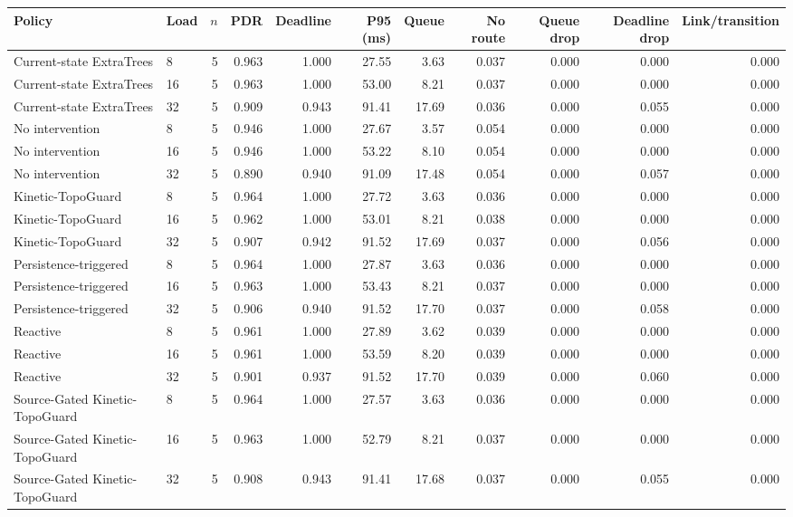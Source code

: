 \begin{tabular}{llrrrrrrrrr}
\toprule
Policy & Load & $n$ & PDR & Deadline & P95 (ms) & Queue & No route & Queue drop & Deadline drop & Link/transition \\
\midrule
Current\mbox{-}state ExtraTrees & 8 & 5 & 0.963 & 1.000 & 27.55 & 3.63 & 0.037 & 0.000 & 0.000 & 0.000 \\
Current\mbox{-}state ExtraTrees & 16 & 5 & 0.963 & 1.000 & 53.00 & 8.21 & 0.037 & 0.000 & 0.000 & 0.000 \\
Current\mbox{-}state ExtraTrees & 32 & 5 & 0.909 & 0.943 & 91.41 & 17.69 & 0.036 & 0.000 & 0.055 & 0.000 \\
No intervention & 8 & 5 & 0.946 & 1.000 & 27.67 & 3.57 & 0.054 & 0.000 & 0.000 & 0.000 \\
No intervention & 16 & 5 & 0.946 & 1.000 & 53.22 & 8.10 & 0.054 & 0.000 & 0.000 & 0.000 \\
No intervention & 32 & 5 & 0.890 & 0.940 & 91.09 & 17.48 & 0.054 & 0.000 & 0.057 & 0.000 \\
Kinetic\mbox{-}TopoGuard & 8 & 5 & 0.964 & 1.000 & 27.72 & 3.63 & 0.036 & 0.000 & 0.000 & 0.000 \\
Kinetic\mbox{-}TopoGuard & 16 & 5 & 0.962 & 1.000 & 53.01 & 8.21 & 0.038 & 0.000 & 0.000 & 0.000 \\
Kinetic\mbox{-}TopoGuard & 32 & 5 & 0.907 & 0.942 & 91.52 & 17.69 & 0.037 & 0.000 & 0.056 & 0.000 \\
Persistence\mbox{-}triggered & 8 & 5 & 0.964 & 1.000 & 27.87 & 3.63 & 0.036 & 0.000 & 0.000 & 0.000 \\
Persistence\mbox{-}triggered & 16 & 5 & 0.963 & 1.000 & 53.43 & 8.21 & 0.037 & 0.000 & 0.000 & 0.000 \\
Persistence\mbox{-}triggered & 32 & 5 & 0.906 & 0.940 & 91.52 & 17.70 & 0.037 & 0.000 & 0.058 & 0.000 \\
Reactive & 8 & 5 & 0.961 & 1.000 & 27.89 & 3.62 & 0.039 & 0.000 & 0.000 & 0.000 \\
Reactive & 16 & 5 & 0.961 & 1.000 & 53.59 & 8.20 & 0.039 & 0.000 & 0.000 & 0.000 \\
Reactive & 32 & 5 & 0.901 & 0.937 & 91.52 & 17.70 & 0.039 & 0.000 & 0.060 & 0.000 \\
Source\mbox{-}Gated Kinetic\mbox{-}TopoGuard & 8 & 5 & 0.964 & 1.000 & 27.57 & 3.63 & 0.036 & 0.000 & 0.000 & 0.000 \\
Source\mbox{-}Gated Kinetic\mbox{-}TopoGuard & 16 & 5 & 0.963 & 1.000 & 52.79 & 8.21 & 0.037 & 0.000 & 0.000 & 0.000 \\
Source\mbox{-}Gated Kinetic\mbox{-}TopoGuard & 32 & 5 & 0.908 & 0.943 & 91.41 & 17.68 & 0.037 & 0.000 & 0.055 & 0.000 \\
\bottomrule
\end{tabular}

